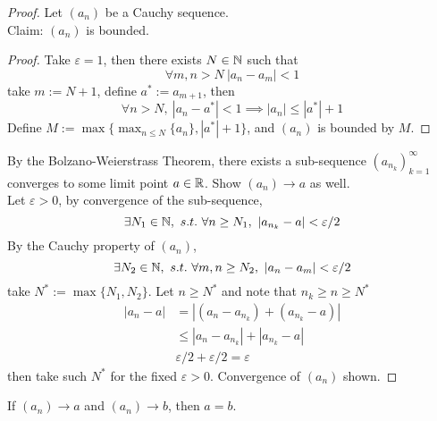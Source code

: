 \documentclass[11pt]{article}
\begin{document}
        \begin{proof}
            Let $(a_n)$ be a Cauchy sequence. \\
            Claim: $(a_n)$ is bounded.
            \begin{proof}
                Take $\varepsilon=1$, then there exists $N \in \mathbb{N}$ such that 
                \begin{equation}
                    \forall m, n > N\ |a_n - a_m| < 1
                \end{equation}
                take $m:=N+1$, define $a^*:=a_{m+1}$, then 
                \begin{equation}
                    \forall n > N,\  |a_n - a^*| < 1 \implies |a_n| \leq |a^*| + 1
                \end{equation}
                Define $M:= \max\{\max_{n \leq N}\{a_n\}, |a^*|+1\}$, and $(a_n)$ is bounded by $M$.
            \end{proof}
            By the Bolzano-Weierstrass Theorem, there exists a sub-sequence $(a_{n_k})_{k=1}^\infty$ converges to some limit point $a \in \mathbb{R}$. Show $(a_n) \to a$ as well. \\
            Let $\varepsilon>0$, by convergence of the sub-sequence, 
            \begin{equation}
                \exists N_1 \in \mathbb{N},\ s.t.\ \forall n \geq N_1,\ |a_{n_k} - a| < \varepsilon / 2
            \end{equation}
            By the Cauchy property of $(a_n)$,
            \begin{equation}
                \exists N_2 \in \mathbb{N},\ s.t.\ \forall m, n \geq N_2,\ |a_n - a_m| < \varepsilon / 2
            \end{equation}
            take $N^* := \max\{N_1, N_2\}$. Let $n \geq N^*$ and note that $n_k \geq n \geq N^*$
            \begin{align}
                |a_n - a| &= |(a_n - a_{n_k}) + (a_{n_k} - a)| \\
                &\leq |a_n - a_{n_k}| + |a_{n_k} - a| \\
                &\varepsilon/2 + \varepsilon/2 = \varepsilon
            \end{align}
            then take such $N^*$ for the fixed $\varepsilon>0$. Convergence of $(a_n)$ shown.
        \end{proof}
        
        \begin{theorem}
            If $(a_n) \to a$ and $(a_n) \to b$, then $a=b$.
        \end{theorem}
        
\end{document}
